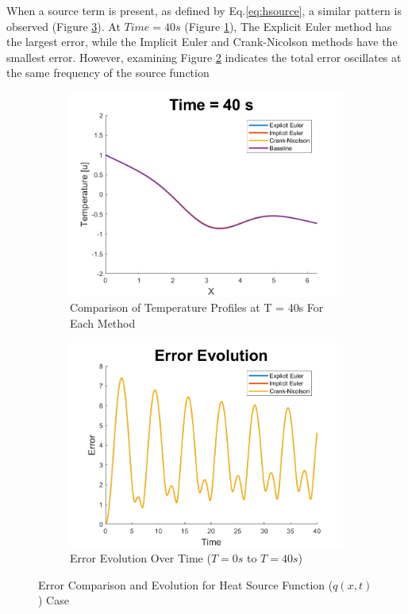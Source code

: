 \documentclass[10pt, letter, showtrims]{extarticle}
\begin{document}
		\noindent
		When a source term is present, as defined by Eq.\ref{eq:hsource}, a similar pattern is observed (Figure \ref{fig:source}). At $Time = 40 s$ (Figure \ref{fig:compsource}), The Explicit Euler method has the largest error, while the Implicit Euler and Crank-Nicolson methods have the smallest error. However, examining Figure \ref{fig:evolutionsource} indicates the total error oscillates at the same frequency of the source function
			
		
		\FloatBarrier
		\begin{figure}[!h]
			\captionsetup[subfigure]{justification=centering}
			\centering
			
			\begin{subfigure}{.45\textwidth}
				\centering
				\includegraphics[width=1\linewidth]{"Figures/MATLAB/SourceCompare"}
				\caption{Comparison of Temperature Profiles at T = 40s For Each Method}
				\label{fig:compsource}
			\end{subfigure}
			\begin{subfigure}{.45\textwidth}
				\centering
				\includegraphics[width=1\linewidth]{"Figures/MATLAB/SourceErrorTime"}
				\caption{Error Evolution Over Time ($T = 0s$ to $T = 40s$)}
				\label{fig:evolutionsource}
			\end{subfigure}
			
			\caption{Error Comparison and Evolution for Heat Source Function ($q(x, t)$) Case}
			\label{fig:source}
		\end{figure}
\end{document}
